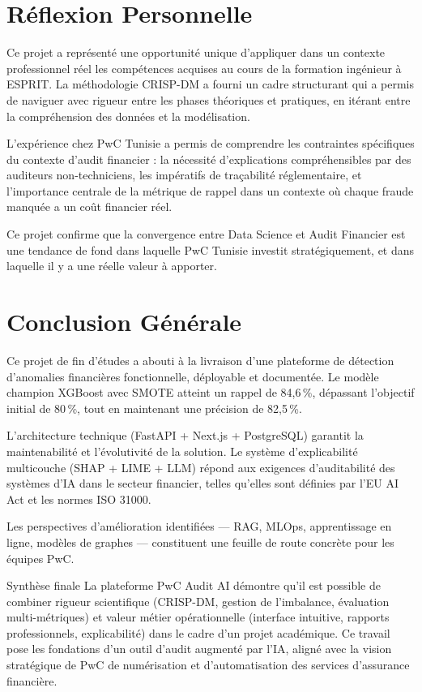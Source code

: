 \documentclass[12pt,a4paper,twoside]{report}
\theoremstyle{definition}
\begin{document}
\section{Réflexion Personnelle}

Ce projet a représenté une opportunité unique d'appliquer dans un contexte
professionnel réel les compétences acquises au cours de la formation ingénieur
à ESPRIT. La méthodologie CRISP-DM a fourni un cadre structurant qui a permis
de naviguer avec rigueur entre les phases théoriques et pratiques, en itérant
entre la compréhension des données et la modélisation.

L'expérience chez PwC Tunisie a permis de comprendre les contraintes spécifiques
du contexte d'audit financier : la nécessité d'explications compréhensibles
par des auditeurs non-techniciens, les impératifs de traçabilité réglementaire,
et l'importance centrale de la métrique de rappel dans un contexte où chaque
fraude manquée a un coût financier réel.

Ce projet confirme que la convergence entre Data Science et Audit Financier
est une tendance de fond dans laquelle PwC Tunisie investit stratégiquement,
et dans laquelle il y a une réelle valeur à apporter.

\section{Conclusion Générale}

Ce projet de fin d'études a abouti à la livraison d'une plateforme de détection
d'anomalies financières fonctionnelle, déployable et documentée. Le modèle
champion XGBoost avec SMOTE atteint un rappel de 84,6\,\%, dépassant l'objectif
initial de 80\,\%, tout en maintenant une précision de 82,5\,\%.

L'architecture technique (FastAPI + Next.js + PostgreSQL) garantit la
maintenabilité et l'évolutivité de la solution. Le système d'explicabilité
multicouche (SHAP + LIME + LLM) répond aux exigences d'auditabilité
des systèmes d'IA dans le secteur financier, telles qu'elles sont
définies par l'EU AI Act et les normes ISO 31000.

Les perspectives d'amélioration identifiées --- RAG, MLOps, apprentissage
en ligne, modèles de graphes --- constituent une feuille de route concrète
pour les équipes PwC.

\begin{pwcbox}{Synthèse finale}
La plateforme PwC Audit AI démontre qu'il est possible de combiner rigueur
scientifique (CRISP-DM, gestion de l'imbalance, évaluation multi-métriques)
et valeur métier opérationnelle (interface intuitive, rapports professionnels,
explicabilité) dans le cadre d'un projet académique. Ce travail pose les
fondations d'un outil d'audit augmenté par l'IA, aligné avec la vision
stratégique de PwC de numérisation et d'automatisation des services
d'assurance financière.
\end{pwcbox}
\end{document}
